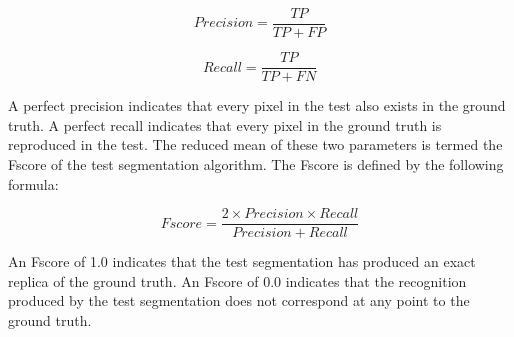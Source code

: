 \begin{equation}
Precision = \frac{TP}{TP + FP}
\end{equation}

\begin{equation}
Recall = \frac{TP}{TP + FN}
\end{equation}

A perfect precision indicates that every pixel in the test also exists in the ground truth. A perfect recall indicates that every pixel in the ground truth is reproduced in the test. The reduced mean of these two parameters is termed the Fscore of the test segmentation algorithm. The Fscore is defined by the following formula:

\begin{equation}
Fscore = \frac{2 \times Precision \times Recall}{Precision + Recall}
\end{equation}

An Fscore of 1.0 indicates that the test segmentation has produced an exact replica of the ground truth. An Fscore of 0.0 indicates that the recognition produced by the test segmentation does not correspond at any point to the ground truth.
